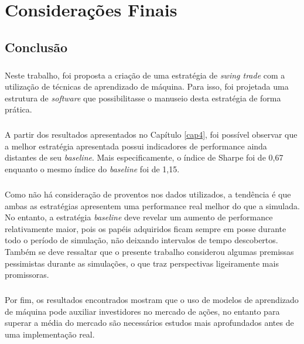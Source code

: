 \chapter{Considerações Finais}
\label{cap5}



\FloatBarrier
\section{Conclusão}



\paragraph{} Neste trabalho, foi proposta a criação de uma estratégia de \textit{swing trade} com a utilização de técnicas de aprendizado de máquina. Para isso, foi projetada uma estrutura de \textit{software} que possibilitasse o manuseio desta estratégia de forma prática.

\paragraph{} A partir dos resultados apresentados no Capítulo \ref{cap4}, foi possível observar que a melhor estratégia apresentada possui indicadores de performance ainda distantes de seu \textit{baseline}. Mais especificamente, o índice de Sharpe foi de 0,67 enquanto o mesmo índice do \textit{baseline} foi de 1,15.

\paragraph{} Como não há consideração de proventos nos dados utilizados, a tendência é que ambas as estratégias apresentem uma performance real melhor do que a simulada. No entanto, a estratégia \textit{baseline} deve revelar um aumento de performance relativamente maior, pois os papéis adquiridos ficam sempre em posse durante todo o período de simulação, não deixando intervalos de tempo descobertos. Também se deve ressaltar que o presente trabalho considerou algumas premissas pessimistas durante as simulações, o que traz perspectivas ligeiramente mais promissoras.

\paragraph{} Por fim, os resultados encontrados mostram que o uso de modelos de aprendizado de máquina pode auxiliar investidores no mercado de ações, no entanto para superar a média do mercado são necessários estudos mais aprofundados antes de uma implementação real.



